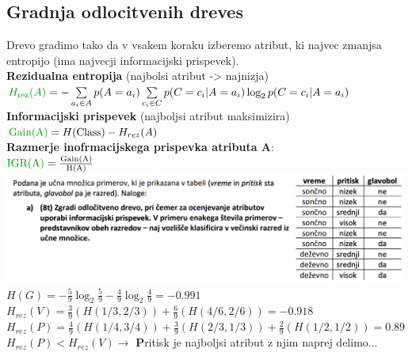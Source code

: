 \subsection{Gradnja odlocitvenih dreves}
Drevo gradimo tako da v vsakem koraku izberemo atribut, ki
najvec zmanjsa entropijo (ima najvecji informacijski prispevek).\\
\textbf{Rezidualna entropija} (najbolsi atribut -> najnizja)\\
$\green{H_{\text{rez}}(A)}=-\sum\limits_{a_i\in A}p(A=a_i)\sum\limits_{c_i\in C} p(C=c_i|A=a_i)\log_2p(C=c_i|A=a_i)$\\
\textbf{Informacijski prispevek} (najboljsi atribut maksimizira)\\
$\text{\green{Gain(A)}}=H(\text{Class})-H_{rez}(A)$\\
\textbf{Razmerje inofrmacijskega prispevka atributa A}:\\ 
$\text{\green{IGR(A)}}=\frac{\text{Gain(A)}}{\text{H(A)}}$\\
\includegraphics[width=\columnwidth]{./images/decision_tree.png}\\
$H(G)=-\frac{5}{9}\log_2\frac{5}{9}-\frac{4}{9}\log_2\frac{4}{9}=-0.991$\\
$H_{rez}(V)=\frac{3}{9}\left(H(1/3, 2/3)\right) + \frac{6}{9}\left(H(4/6, 2/6)\right)=-0.918$\\
$H_{rez}(P)=\frac{4}{9}\left(H(1/4, 3/4)\right) + \frac{3}{9}\left(H(2/3, 1/3)\right) + \frac{2}{9}\left(H(1/2, 1/2)\right)=0.89$\\
$H_{rez}(P)< H_{rez}(V) \rightarrow$ \textbf{P}ritisk je najboljsi atribut z njim naprej delimo...\\

